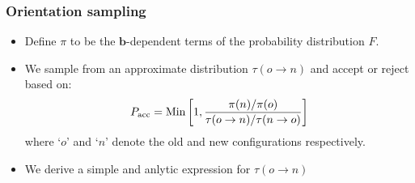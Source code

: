\documentclass[xcolor=svgnames]{beamer}
\DeclareRobustCommand{\mbf}[1]{{\boldsymbol {#1}}}
\begin{document}
        \begin{frame}
            \frametitle{Orientation sampling}
            \begin{itemize}
                \item Define $\pi$ to be the $\mbf{b}$-dependent terms of the probability distribution $F$.
                \item We sample from an approximate distribution $\tau (o \to n)$ and accept or reject based on:
                \begin{equation*}
                    \label{eq:Pacc}
                    P_{\rm acc} = \text{Min} \left[1, \frac{\pi(n)/\pi(o)}{\tau (o \to n)/\tau (n \to o)} \right]
                \end{equation*}
                where `$o$' and `$n$' denote the old and new configurations respectively.
                \item We derive a simple and anlytic expression for $\tau (o \to n)$
            \end{itemize}
        \end{frame}
\end{document}
